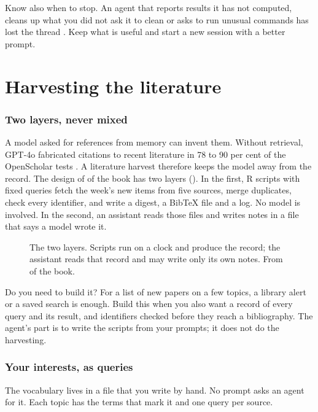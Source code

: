 \documentclass[11pt,a4paper]{article}
\begin{document}
Know also when to stop. An agent that reports results it has not computed,
cleans up what you did not ask it to clean or asks to run unusual commands
has lost the thread \parencite{eren2026agenticcoding}. Keep what is useful and start a new
session with a better prompt.

\part{Harvesting the literature}

\section{Two layers, never mixed}
\label{sec:twolayers}

A model asked for references from memory can invent them. Without retrieval,
GPT-4o fabricated citations to recent literature in 78 to 90 per cent of the
OpenScholar tests \parencite{asai2026openscholar}. A literature harvest
therefore keeps the model away from the record. The design of \bkLiterature{}
of the book has two layers (). In the first, R scripts
with fixed queries fetch the week's new items from five sources, merge
duplicates, check every identifier, and write a digest, a BibTeX file and a
log. No model is involved. In the second, an assistant reads those files and
writes notes in a file that says a model wrote it.

\begin{figure}[htbp]
\centering
{}
\caption{The two layers. Scripts run on a clock and produce the record; the
assistant reads that record and may write only its own notes. From
\bkLiterature{} of the book.}
\label{fig:twolayers}
\end{figure}

Do you need to build it? For a list of new papers on a few topics, a
library alert or a saved search is enough. Build this when you also want a
record of every query and its result, and identifiers checked before they
reach a bibliography. The agent's part is to write the scripts from your
prompts; it does not do the harvesting.

\section{Your interests, as queries}

The vocabulary lives in a file that you write by hand. No prompt asks an
agent for it. Each topic has the terms that mark it and one query per source.
\end{document}
